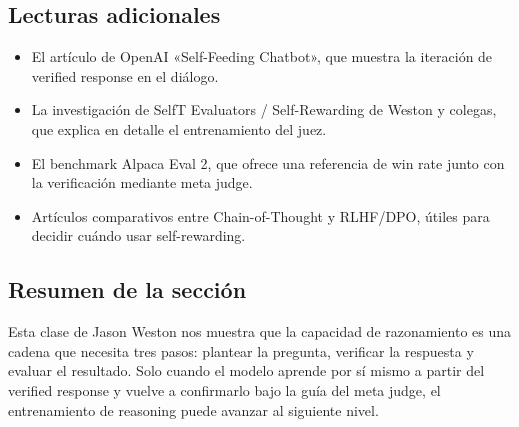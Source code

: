 \documentclass[a4paper]{article}
\begin{document}
\subsection{Lecturas adicionales}
\begin{itemize}
    \item El artículo de OpenAI «Self-Feeding Chatbot», que muestra la iteración de verified response en el diálogo.
    \item La investigación de SelfT Evaluators / Self-Rewarding de Weston y colegas, que explica en detalle el entrenamiento del juez.
    \item El benchmark Alpaca Eval 2, que ofrece una referencia de win rate junto con la verificación mediante meta judge.
    \item Artículos comparativos entre Chain-of-Thought y RLHF/DPO, útiles para decidir cuándo usar self-rewarding.
\end{itemize}

\subsection{Resumen de la sección}
Esta clase de Jason Weston nos muestra que la capacidad de razonamiento es una cadena que necesita tres pasos: plantear la pregunta, verificar la respuesta y evaluar el resultado. Solo cuando el modelo aprende por sí mismo a partir del verified response y vuelve a confirmarlo bajo la guía del meta judge, el entrenamiento de reasoning puede avanzar al siguiente nivel.
\end{document}
